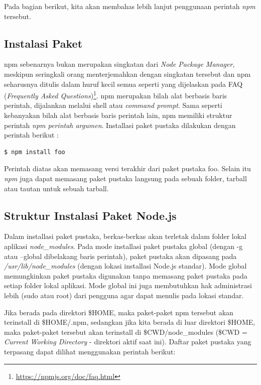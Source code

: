 Pada bagian berikut, kita akan membahas lebih lanjut penggunaan perintah \textit{npm} tersebut.

\subsection{Instalasi Paket}

npm sebenarnya bukan merupakan singkatan dari \textit{Node Package Manager}, meskipun seringkali orang menterjemahkan dengan singkatan tersebut dan npm seharusnya ditulis dalam huruf kecil semua seperti yang dijelaskan pada FAQ (\textit{Frequently Asked Questions})\footnote{\url{https://npmjs.org/doc/faq.html}}. npm merupakan bilah alat berbasis baris perintah, dijalankan melalui shell atau \textit{command prompt}. Sama seperti kebanyakan bilah alat berbasis baris perintah lain, npm memiliki struktur perintah \textit{npm perintah argumen}. Installasi paket pustaka dilakukan dengan perintah berikut :

\lstset{language=bash,caption=Cara install paket menggunakan npm}
\begin{lstlisting}
$ npm install foo
\end{lstlisting}

Perintah diatas akan memasang versi terakhir dari paket pustaka foo. Selain itu \textit{npm} juga dapat memasang paket pustaka langsung pada sebuah folder, tarball atau tautan untuk sebuah tarball.

\subsection{Struktur Instalasi Paket Node.js}

Dalam installasi paket pustaka, berkas-berkas akan terletak dalam folder lokal aplikasi \textit{node\_modules}. Pada mode installasi paket pustaka global (dengan -g atau --global dibelakang baris perintah), paket pustaka akan dipasang pada \textit{/usr/lib/node\_modules} (dengan lokasi installasi Node.js standar). Mode global memungkinkan paket pustaka digunakan tanpa memasang paket pustaka pada setiap folder lokal aplikasi. Mode global ini juga membutuhkan hak administrasi lebih (sudo atau root) dari pengguna agar dapat menulis pada lokasi standar. 

Jika berada pada direktori \$HOME, maka paket-paket npm tersebut akan terinstall di \$HOME/.npm, sedangkan jika kita berada di luar direktori \$HOME, maka paket-paket tersebut akan terinstall di \$CWD/node\_modules (\$CWD = \textit{Current Working Directory} - direktori aktif saat ini). Daftar paket pustaka yang terpasang dapat dilihat menggunakan perintah berikut:

